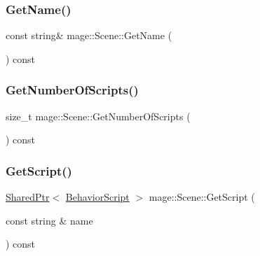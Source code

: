 \hypertarget{classmage_1_1_scene_a251ff8f6ce0da5c55ee31e3450b5fb9a}{}\label{classmage_1_1_scene_a251ff8f6ce0da5c55ee31e3450b5fb9a} 
\subsubsection{\texorpdfstring{Get\+Name()}{GetName()}}
{\footnotesize\ttfamily const string\& mage\+::\+Scene\+::\+Get\+Name (\begin{DoxyParamCaption}{ }\end{DoxyParamCaption}) const}

\hypertarget{classmage_1_1_scene_a799ac8ddd90d24f6c3c208942e4f159c}{}\label{classmage_1_1_scene_a799ac8ddd90d24f6c3c208942e4f159c} 
\subsubsection{\texorpdfstring{Get\+Number\+Of\+Scripts()}{GetNumberOfScripts()}}
{\footnotesize\ttfamily size\+\_\+t mage\+::\+Scene\+::\+Get\+Number\+Of\+Scripts (\begin{DoxyParamCaption}{ }\end{DoxyParamCaption}) const}

\hypertarget{classmage_1_1_scene_aa5d10620d1cf62ba268095f7a2cd2191}{}\label{classmage_1_1_scene_aa5d10620d1cf62ba268095f7a2cd2191} 
\subsubsection{\texorpdfstring{Get\+Script()}{GetScript()}}
{\footnotesize\ttfamily \hyperlink{namespacemage_a1e01ae66713838a7a67d30e44c67703e}{Shared\+Ptr}$<$ \hyperlink{classmage_1_1_behavior_script}{Behavior\+Script} $>$ mage\+::\+Scene\+::\+Get\+Script (\begin{DoxyParamCaption}\item[{const string \&}]{name }\end{DoxyParamCaption}) const}

\hypertarget{classmage_1_1_scene_a0365a6a2e83519ad33280cc607408b4a}{}\label{classmage_1_1_scene_a0365a6a2e83519ad33280cc607408b4a} 
